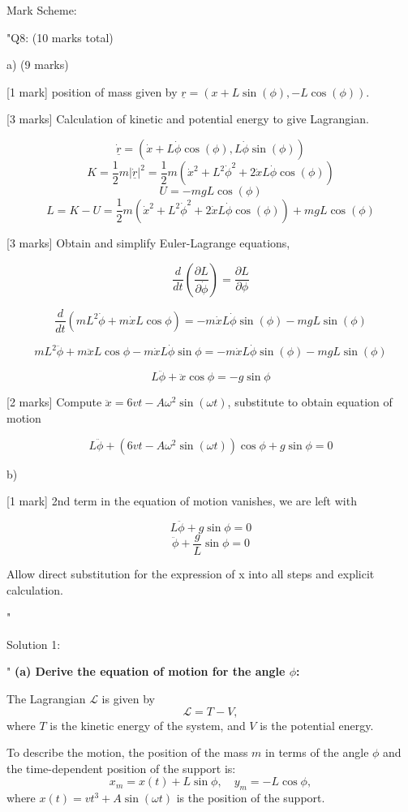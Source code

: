 Mark Scheme:

"{Q8: (10 marks total)}

a) (9 marks)

[1 mark] position of mass given by \( \underline{r} = (x + L \sin(\phi), -L \cos(\phi)) \). 

[3 marks] Calculation of kinetic and potential energy to give Lagrangian. 

\[ \dot{\underline{r}} = (\dot{x} + L\dot{\phi}\cos(\phi), L\dot{\phi}\sin(\phi) ) \]
\[ K = \frac{1}{2}m |\dot{\underline{r}}|^2 = \frac{1}{2}m (\dot{x}^2 + L^2 \dot{\phi}^2 + 2\dot{x}L\dot{\phi}\cos(\phi) ) \]
\[ U = -mgL \cos(\phi) \]
\[ L = K - U = \frac{1}{2}m \left(\dot{x}^2 + L^2 \dot{\phi}^2 + 2\dot{x}L\dot{\phi}\cos(\phi) \right) + mgL \cos(\phi) \]

[3 marks] Obtain and simplify Euler-Lagrange equations, 

\[ \frac{d}{dt}\left ( \frac{\partial L}{\partial \dot{\phi}} \right ) = \frac{\partial L}{\partial \phi} \]

\[ \frac{d}{dt} \left ( mL^2\dot{\phi} + m\dot{x}L\cos{\phi} \right ) = -m\dot{x}L\dot{\phi}\sin(\phi) - mgL\sin(\phi) \]

\[ mL^2 \ddot{\phi} + m\ddot{x}L\cos{\phi} - m\dot{x}L\dot{\phi}\sin{\phi} = -m\dot{x}L\dot{\phi}\sin(\phi) - mgL\sin(\phi) \]

\[ L \ddot{\phi} + \ddot{x}\cos{\phi} = - g\sin{\phi} \]

[2 marks] Compute \( \ddot{x} = 6vt - A \omega^2 \sin(\omega t) \), substitute to obtain equation of motion

\[ L \ddot{\phi} + \left (6vt - A\omega^2\sin(\omega t) \right )\cos{\phi} + g\sin{\phi} = 0 \]

b) 

[1 mark] 2nd term in the equation of motion vanishes, we are left with 

\[  L \ddot{\phi} + g\sin{\phi} = 0 \]
\[ \ddot{\phi} + \frac{g}{L}\sin{\phi} = 0 \]

Allow direct substitution for the expression of x into all steps and explicit calculation.

"

Solution 1: 

"
\textbf{(a) Derive the equation of motion for the angle $\phi$:}

The Lagrangian $\mathcal{L}$ is given by
\[
\mathcal{L} = T - V,
\]
where $T$ is the kinetic energy of the system, and $V$ is the potential energy. 

To describe the motion, the position of the mass $m$ in terms of the angle $\phi$ and the time-dependent position of the support is:
\[
x_m = x(t) + L\sin\phi, \quad y_m = -L\cos\phi,
\]
where $x(t) = vt^3 + A\sin(\omega t)$ is the position of the support.

